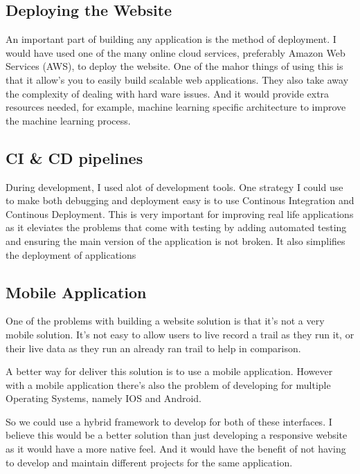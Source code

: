 \subsection{Deploying the Website}
An important part of building any application is the method of deployment. I would have used one of the many online cloud services, preferably Amazon Web Services (AWS), to deploy the website. One of the mahor things of using this is that it allow's you to easily build scalable web applications. They also take away the complexity of dealing with hard ware issues. And it would provide extra resources needed, for example, machine learning specific architecture to improve the machine learning process.

\subsection{CI \& CD pipelines}
During development, I used alot of development tools. One strategy I could use to make both debugging and deployment easy is to use Continous Integration and Continous Deployment. This is very important for improving real life applications as it eleviates the problems that come with testing by adding automated testing and ensuring the main version of the application is not broken. It also simplifies the deployment of applications

\subsection{Mobile Application}
One of the problems with building a website solution is that it's not a very mobile solution. It's not easy to allow users to live record a trail as they run it, or their live data as they run an already ran trail to help in comparison. 

A better way for deliver this solution is to use a mobile application. However with a mobile application there's also the problem of developing for multiple Operating Systems, namely IOS and Android.

So we could use a hybrid framework to develop for both of these interfaces. I believe this would be a better solution than just developing a responsive website as it would have a more native feel. And it would have the benefit of not having to develop and maintain different projects for the same application.